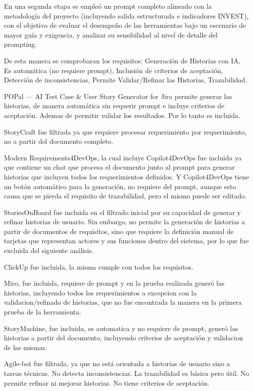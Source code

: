 En una segunda etapa se empleó un prompt completo alineado con la metodología del proyecto (incluyendo salida estructurada e indicadores INVEST), con el objetivo de evaluar el desempeño de las herramientas bajo un escenario de mayor guía y exigencia, y analizar su sensibilidad al nivel de detalle del prompting.


De esta manera se comprobaran los requisitos: Generación de Historias con IA, Es automática (no requiere prompt), Inclusión de criterios de aceptación, Detección de inconsistencias, Permite Validar/Refinar las Historias, Trazabilidad.

POPal --- AI Test Case \& User Story Generator for Jira permite generar las historias, de manera automática sin requerir prompt e incluye criterios de aceptación. Ademas de permitir validar los resultados. Por lo tanto es incluida.

StoryCraft fue filtrada ya que requiere procesar requerimiento por requerimiento, no a partir del documento completo. %

Modern Requirements4DevOps, la cual incluye Copilot4DevOps fue incluida ya que contiene un chat que procesa el documento junto al prompt para generar historias que incluyen todos los requerimientos definidos. Y Copilot4DevOps tiene un botón automático para la generación, no requiere del prompt, aunque esto causa que se pierda el requisito de trazabilidad, pero el mismo puede ser editado.

StoriesOnBoard fue incluida en el filtrado inicial por su capacidad de generar
y refinar historias de usuario. Sin embargo, no permite la generación de
historias a partir de documentos de requisitos, sino que requiere la definición
manual de tarjetas que representan actores y sus funciones dentro del sistema, por lo que fue excluida del siguiente análisis.

ClickUp fue incluida, la misma cumple con todos los requisitos.

Miro, fue incluida, requiere de prompt y en la prueba realizada generó las historias, incluyendo todos los requerimientos a excepcion con la validacion/refinado de historias, que no fue encontrada la manera en la primera prueba de la herramienta.

StoryMachine, fue incluida, es automatica y no requiere de prompt, generó las historias a partir del documento, incluyendo criterios de aceptación y validacion de las mismas.

Agile-bot fue filtrada, ya que no está orientada a historias de usuario sino a tareas técnicas. No detecta inconsistencias. La trazabilidad es básica pero útil. No permite refinar ni mejorar historias. No tiene criterios de aceptación.


